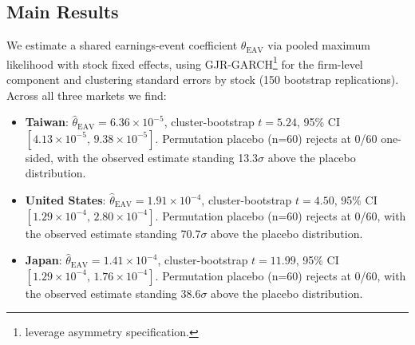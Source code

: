 \documentclass[12pt,a4paper]{article}
\begin{document}
\subsection*{Main Results}

We estimate a shared earnings-event coefficient $\theta_{\mathrm{EAV}}$ via
pooled maximum likelihood with stock fixed effects, using GJR-GARCH\footnote{%
\citet{glosten1993} leverage asymmetry specification.} for the firm-level
component and clustering standard errors by stock (150 bootstrap replications).
Across all three markets we find:
%
\begin{itemize}
\item \textbf{Taiwan}: $\hat{\theta}_{\mathrm{EAV}} = 6.36\times10^{-5}$,
  cluster-bootstrap $t = 5.24$, 95\% CI $[4.13\times10^{-5},\,9.38\times10^{-5}]$.
  Permutation placebo (n=60) rejects at 0/60 one-sided, with the observed
  estimate standing 13.3$\sigma$ above the placebo distribution.

\item \textbf{United States}: $\hat{\theta}_{\mathrm{EAV}} = 1.91\times10^{-4}$,
  cluster-bootstrap $t = 4.50$, 95\% CI $[1.29\times10^{-4},\,2.80\times10^{-4}]$.
  Permutation placebo (n=60) rejects at 0/60, with the observed estimate
  standing 70.7$\sigma$ above the placebo distribution.

\item \textbf{Japan}: $\hat{\theta}_{\mathrm{EAV}} = 1.41\times10^{-4}$,
  cluster-bootstrap $t = 11.99$, 95\% CI $[1.29\times10^{-4},\,1.76\times10^{-4}]$.
  Permutation placebo (n=60) rejects at 0/60, with the observed estimate
  standing 38.6$\sigma$ above the placebo distribution.
\end{itemize}
\end{document}
